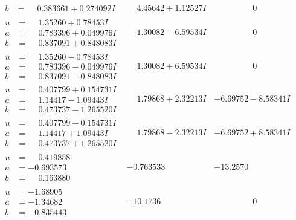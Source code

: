 \documentclass[1p]{elsarticle_modified}
\theoremstyle{definition}
\begin{document}
$$\begin{array}{c|c|c}
\begin{aligned}
b &= \phantom{-}0.383661 + 0.274092 I\end{aligned}
 & \phantom{-}4.45642 + 1.12527 I & \phantom{-0.000000 } 0 \\ \hline\begin{aligned}
u &= \phantom{-}1.35260 + 0.78453 I \\
a &= \phantom{-}0.783396 + 0.049976 I \\
b &= \phantom{-}0.837091 + 0.848083 I\end{aligned}
 & \phantom{-}1.30082 - 6.59534 I & \phantom{-0.000000 } 0 \\ \hline\begin{aligned}
u &= \phantom{-}1.35260 - 0.78453 I \\
a &= \phantom{-}0.783396 - 0.049976 I \\
b &= \phantom{-}0.837091 - 0.848083 I\end{aligned}
 & \phantom{-}1.30082 + 6.59534 I & \phantom{-0.000000 } 0 \\ \hline\begin{aligned}
u &= \phantom{-}0.407799 + 0.154731 I \\
a &= \phantom{-}1.14417 - 1.09443 I \\
b &= \phantom{-}0.473737 - 1.265520 I\end{aligned}
 & \phantom{-}1.79868 + 2.32213 I & -6.69752 - 8.58341 I \\ \hline\begin{aligned}
u &= \phantom{-}0.407799 - 0.154731 I \\
a &= \phantom{-}1.14417 + 1.09443 I \\
b &= \phantom{-}0.473737 + 1.265520 I\end{aligned}
 & \phantom{-}1.79868 - 2.32213 I & -6.69752 + 8.58341 I \\ \hline\begin{aligned}
u &= \phantom{-}0.419858\phantom{ +0.000000I} \\
a &= -0.693573\phantom{ +0.000000I} \\
b &= \phantom{-}0.163880\phantom{ +0.000000I}\end{aligned}
 & -0.763533\phantom{ +0.000000I} & -13.2570\phantom{ +0.000000I} \\ \hline\begin{aligned}
u &= -1.68905\phantom{ +0.000000I} \\
a &= -1.34682\phantom{ +0.000000I} \\
b &= -0.835443\phantom{ +0.000000I}\end{aligned}
 & -10.1736\phantom{ +0.000000I} & \phantom{-0.000000 } 0 \\ \hline\begin{aligned}

\end{aligned}
\end{array}$$
\end{document}
